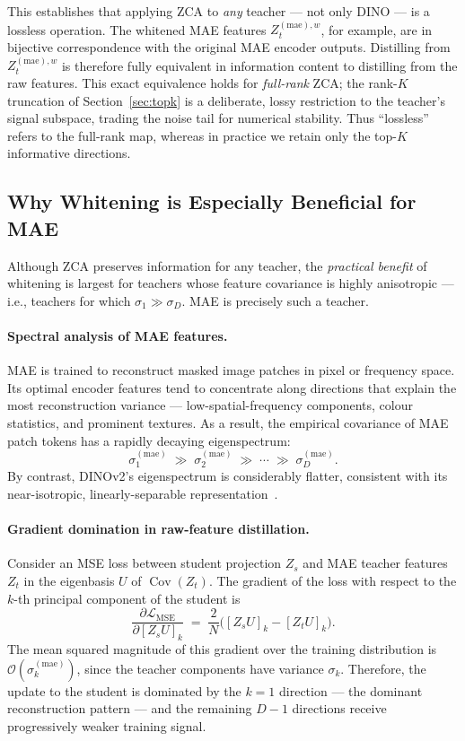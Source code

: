 \documentclass[11pt,a4paper]{article}
\newcommand{\calL}{\mathcal{L}}
\newcommand{\Cov}{\operatorname{Cov}}
\begin{document}
This establishes that applying ZCA to \emph{any} teacher — not only DINO — is a
lossless operation.  The whitened MAE features $Z_t^{(\mathrm{mae}),w}$, for
example, are in bijective correspondence with the original MAE encoder outputs.
Distilling from $Z_t^{(\mathrm{mae}),w}$ is therefore fully equivalent in
information content to distilling from the raw features.
This exact equivalence holds for \emph{full-rank} ZCA; the rank-$K$ truncation of
Section~\ref{sec:topk} is a deliberate, lossy restriction to the teacher's signal
subspace, trading the noise tail for numerical stability.  Thus ``lossless''
refers to the full-rank map, whereas in practice we retain only the top-$K$
informative directions.

\subsection{Why Whitening is Especially Beneficial for MAE}
\label{sec:mae_benefit}

Although ZCA preserves information for any teacher, the \emph{practical benefit}
of whitening is largest for teachers whose feature covariance is highly
anisotropic — i.e., teachers for which $\sigma_1 \gg \sigma_D$.
MAE is precisely such a teacher.

\paragraph{Spectral analysis of MAE features.}
MAE is trained to reconstruct masked image patches in pixel or frequency space.
Its optimal encoder features tend to concentrate along directions that explain the
most reconstruction variance — low-spatial-frequency components, colour statistics,
and prominent textures.  As a result, the empirical covariance of MAE patch
tokens has a rapidly decaying eigenspectrum:
\[
    \sigma_1^{(\mathrm{mae})} \;\gg\; \sigma_2^{(\mathrm{mae})} \;\gg\; \cdots
    \;\gg\; \sigma_D^{(\mathrm{mae})}.
\]
By contrast, DINOv2's eigenspectrum is considerably flatter, consistent with its
near-isotropic, linearly-separable representation~\citep{oquab2023dinov2}.

\paragraph{Gradient domination in raw-feature distillation.}
Consider an MSE loss between student projection $Z_s$ and MAE teacher features
$Z_t$ in the eigenbasis $U$ of $\Cov(Z_t)$.  The gradient of the loss with
respect to the $k$-th principal component of the student is
\[
    \frac{\partial \calL_{\mathrm{MSE}}}{\partial [Z_s U]_k}
    \;=\; \frac{2}{N}\bigl([Z_s U]_k - [Z_t U]_k\bigr).
\]
The mean squared magnitude of this gradient over the training distribution
is $\mathcal{O}(\sigma_k^{(\mathrm{mae})})$, since the teacher components have
variance $\sigma_k$.  Therefore, the update to the student is dominated by the
$k=1$ direction — the dominant reconstruction pattern — and the remaining $D-1$
directions receive progressively weaker training signal.
\end{document}
